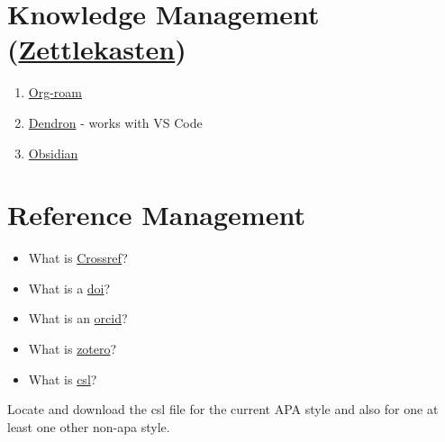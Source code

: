 \documentclass[
  letterpaper,
  DIV=11,
  numbers=noendperiod]{scrreprt}
\providecommand{\tightlist}{%
  \setlength{\itemsep}{0pt}\setlength{\parskip}{0pt}}\usepackage{longtable,booktabs,array}
\begin{document}

\chapter{\texorpdfstring{Knowledge Management
(\href{https://en.wikipedia.org/wiki/Zettelkasten}{Zettlekasten})}{Knowledge Management (Zettlekasten)}}\label{knowledge-management-zettlekasten}

\begin{enumerate}
\def\labelenumi{\arabic{enumi}.}
\tightlist
\item
  \href{https://github.com/org-roam/org-roam}{Org-roam}
\item
  \href{https://github.com/dendronhq/dendron}{Dendron} - works with VS
  Code
\item
  \href{https://obsidian.md/}{Obsidian}
\end{enumerate}


\chapter{Reference Management}\label{reference-management}

\begin{itemize}
\tightlist
\item
  What is \href{https://www.crossref.org/}{Crossref}?
\item
  What is a \href{https://www.doi.org/}{doi}?
\item
  What is an \href{https://orcid.org/}{orcid}?
\item
  What is \href{https://www.zotero.org/}{zotero}?
\item
  What is \href{https://citationstyles.org/}{csl}?
\end{itemize}

\begin{tcolorbox}[enhanced jigsaw, opacityback=0, leftrule=.75mm, colback=white, left=2mm, titlerule=0mm, toprule=.15mm, toptitle=1mm, coltitle=black, title=\textcolor{quarto-callout-tip-color}{\faLightbulb}\hspace{0.5em}{Classroom Exercise}, opacitybacktitle=0.6, colbacktitle=quarto-callout-tip-color!10!white, breakable, bottomrule=.15mm, bottomtitle=1mm, colframe=quarto-callout-tip-color-frame, arc=.35mm, rightrule=.15mm]

Locate and download the csl file for the current APA style and also for
one at least one other non-apa style.

\end{tcolorbox}
\end{document}
